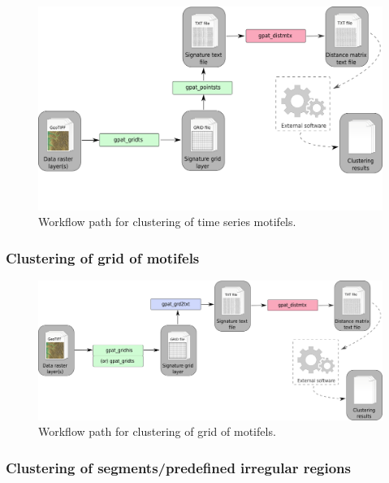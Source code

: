 \documentclass[12pt,margin=0.5in]{article}
\begin{document}
\begin{figure}[H]
	\centering
	\includegraphics[width=\textwidth]{cluster_pointsts_scheme.png}
	\caption{Workflow path for clustering of time series motifels.}
	\label{FIG:CLUSTER_POINTSTS}
\end{figure}

\FloatBarrier

\subsubsection{Clustering of grid of motifels}

\begin{figure}[H]
	\centering
	\includegraphics[width=\textwidth]{cluster_grid_scheme.png}
	\caption{Workflow path for clustering of grid of motifels.}
	\label{FIG:CLUSTER_GRID}
\end{figure}

\FloatBarrier

\subsubsection{Clustering of segments/predefined irregular regions}
\end{document}
